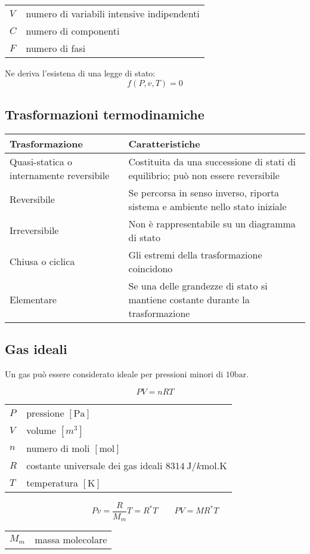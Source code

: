 \begin{tabular}{ll}
    $V$ & numero di variabili intensive indipendenti \\
    $C$ & numero di componenti \\
    $F$ & numero di fasi \\
\end{tabular}

Ne deriva l'esistena di una legge di stato:
\[f(P, v, T) = 0\]

\subsection{Trasformazioni termodinamiche}
\begin{tabular}{p{3.1cm}p{4cm}}
    \toprule
    Trasformazione & Caratteristiche \\
    \midrule
    Quasi-statica o \newline internamente reversibile & Costituita da una successione di stati di equilibrio; può non essere reversibile \\
    Reversibile & Se percorsa in senso inverso, riporta sistema e ambiente nello stato iniziale \\
    Irreversibile & Non è rappresentabile su un diagramma di stato \\
    Chiusa o ciclica & Gli estremi della trasformazione coincidono \\
    Elementare & Se una delle grandezze di stato si mantiene costante durante la trasformazione \\
    \bottomrule
\end{tabular}

\subsection{Gas ideali}
Un gas può essere considerato ideale per pressioni minori di $\si{10\bar}$.

\[PV = nRT\]
\begin{tabular}{ll}
    $P$ & pressione $[\si{\pascal}]$ \\
    $V$ & volume $[\si{m^3}]$ \\
    $n$ & numero di moli $[\si{\mol}]$ \\
    $R$ & costante universale dei gas ideali $\SI{8314}{\J/k\mol.\K}$ \\
    $T$ & temperatura $[\si{\K}]$
\end{tabular}

\[Pv = \frac{R}{M_m}T = R^*T \qquad PV = MR^*T \]
\begin{tabular}{ll}
    $M_m$ & massa molecolare \\
\end{tabular}

